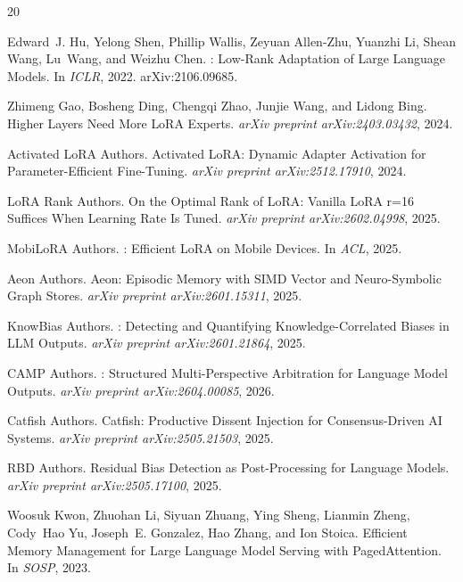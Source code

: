 \documentclass[11pt,a4paper]{article}
\begin{document}
\begin{thebibliography}{20}

Edward~J. Hu, Yelong Shen, Phillip Wallis, Zeyuan Allen-Zhu, Yuanzhi Li, Shean Wang, Lu~Wang, and Weizhu Chen.
: Low-Rank Adaptation of Large Language Models.
\newblock In \emph{ICLR}, 2022.
\newblock arXiv:2106.09685.

Zhimeng Gao, Bosheng Ding, Chengqi Zhao, Junjie Wang, and Lidong Bing.
\newblock Higher Layers Need More {LoRA} Experts.
\newblock \emph{arXiv preprint arXiv:2403.03432}, 2024.

{Activated LoRA Authors}.
\newblock Activated {LoRA}: Dynamic Adapter Activation for Parameter-Efficient Fine-Tuning.
\newblock \emph{arXiv preprint arXiv:2512.17910}, 2024.

{LoRA Rank Authors}.
\newblock On the Optimal Rank of {LoRA}: Vanilla {LoRA} r=16 Suffices When Learning Rate Is Tuned.
\newblock \emph{arXiv preprint arXiv:2602.04998}, 2025.

{MobiLoRA Authors}.
: Efficient {LoRA} on Mobile Devices.
\newblock In \emph{ACL}, 2025.

{Aeon Authors}.
\newblock Aeon: Episodic Memory with {SIMD} Vector and Neuro-Symbolic Graph Stores.
\newblock \emph{arXiv preprint arXiv:2601.15311}, 2025.

{KnowBias Authors}.
: Detecting and Quantifying Knowledge-Correlated Biases in {LLM} Outputs.
\newblock \emph{arXiv preprint arXiv:2601.21864}, 2025.

{CAMP Authors}.
: Structured Multi-Perspective Arbitration for Language Model Outputs.
\newblock \emph{arXiv preprint arXiv:2604.00085}, 2026.

{Catfish Authors}.
\newblock Catfish: Productive Dissent Injection for Consensus-Driven {AI} Systems.
\newblock \emph{arXiv preprint arXiv:2505.21503}, 2025.

{RBD Authors}.
\newblock Residual Bias Detection as Post-Processing for Language Models.
\newblock \emph{arXiv preprint arXiv:2505.17100}, 2025.

Woosuk Kwon, Zhuohan Li, Siyuan Zhuang, Ying Sheng, Lianmin Zheng, Cody~Hao Yu, Joseph~E. Gonzalez, Hao Zhang, and Ion Stoica.
\newblock Efficient Memory Management for Large Language Model Serving with {PagedAttention}.
\newblock In \emph{SOSP}, 2023.


\end{thebibliography}
\end{document}
